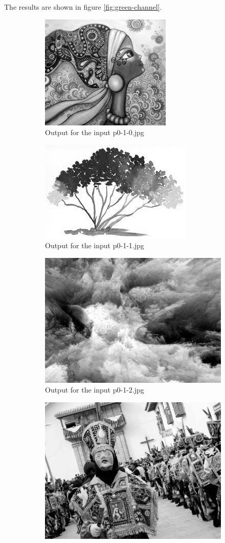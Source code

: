 \begin{enumerate}[label=\emph{\alph*)}]
The results are shown in figure \ref{fig:green-channel}.
\begin{figure}[h!]
\centering
\begin{subfigure}{0.5\textwidth}
  \centering
  \includegraphics[width=0.5\linewidth]{../output/p0-2-b-0.jpg}
  \caption{Output for the input p0-1-0.jpg}
  \label{fig:sfig1}
\end{subfigure}%
\begin{subfigure}{0.5\textwidth}
  \centering
  \includegraphics[width=0.5\linewidth]{../output/p0-2-b-1.jpg}
  \caption{Output for the input p0-1-1.jpg}
  \label{fig:sfig2}
\end{subfigure}
\begin{subfigure}{0.5\textwidth}
  \centering
  \includegraphics[width=0.5\linewidth]{../output/p0-2-b-2.jpg}
  \caption{Output for the input p0-1-2.jpg}
  \label{fig:sfig1}
\end{subfigure}%
\begin{subfigure}{0.5\textwidth}
  \centering
  \includegraphics[width=0.5\linewidth]{../output/p0-2-b-3.jpg}

\end{subfigure}
\end{figure}
\end{enumerate}
